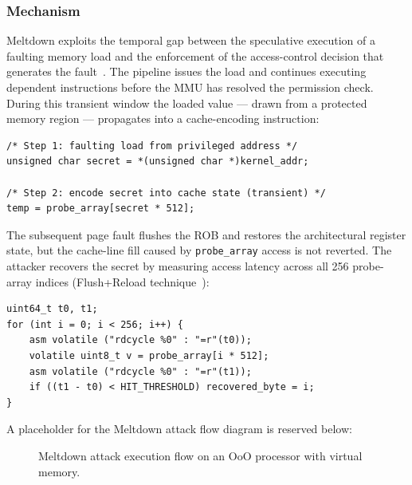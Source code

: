 \subsubsection{Mechanism}

Meltdown exploits the temporal gap between the speculative execution of a
faulting memory load and the enforcement of the access-control decision that
generates the fault~\cite{lipp2018meltdown}. The pipeline issues the load and
continues executing dependent instructions before the MMU has resolved the
permission check. During this transient window the loaded value — drawn from a
protected memory region — propagates into a cache-encoding instruction:

\begin{lstlisting}[style=cstyle, caption={Meltdown-style transient execution example}, label={lst:meltdown_example}]
/* Step 1: faulting load from privileged address */
unsigned char secret = *(unsigned char *)kernel_addr;

/* Step 2: encode secret into cache state (transient) */
temp = probe_array[secret * 512];
\end{lstlisting}

The subsequent page fault flushes the ROB and restores the architectural
register state, but the cache-line fill caused by \texttt{probe\_array} access
is not reverted. The attacker recovers the secret by measuring access latency
across all 256 probe-array indices (Flush+Reload
technique~\cite{lipp2018meltdown,gruss2016flushflush}):

\begin{lstlisting}[style=cstyle, caption={Meltdown secret recovery example}, label={lst:meltdown_recovery}]
uint64_t t0, t1;
for (int i = 0; i < 256; i++) {
    asm volatile ("rdcycle %0" : "=r"(t0));
    volatile uint8_t v = probe_array[i * 512];
    asm volatile ("rdcycle %0" : "=r"(t1));
    if ((t1 - t0) < HIT_THRESHOLD) recovered_byte = i;
}
\end{lstlisting}

A placeholder for the Meltdown attack flow diagram is reserved below:

\begin{figure}[h]
  \centering
  \caption{Meltdown attack execution flow on an OoO processor with virtual memory.}
  \label{fig:meltdown_flow}
\end{figure}

